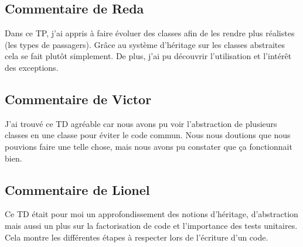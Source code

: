 \documentclass[a4paper,11pt]{article}
\begin{document}
\subsection{Commentaire de Reda}
Dans ce TP, j'ai appris à faire évoluer des classes afin de les rendre plus réalistes (les types de passagers). Grâce au système d'héritage sur les classes abstraites cela se fait plutôt simplement. De plus, j'ai pu découvrir l'utilisation et l'intérêt des exceptions.

\subsection{Commentaire de Victor}
J'ai trouvé ce TD agréable car nous avons pu voir l'abstraction de plusieurs classes en une classe pour éviter le code commun. Nous nous doutions que nous pouvions faire une telle chose, mais nous avons pu constater que ça fonctionnait bien.

\subsection{Commentaire de Lionel}
Ce TD était pour moi un approfondissement des notions d'héritage, d'abstraction mais aussi un plus sur la factorisation de code et l'importance des tests
unitaires. Cela montre les différentes étapes à respecter lors de l'écriture
d'un code.
\end{document}
